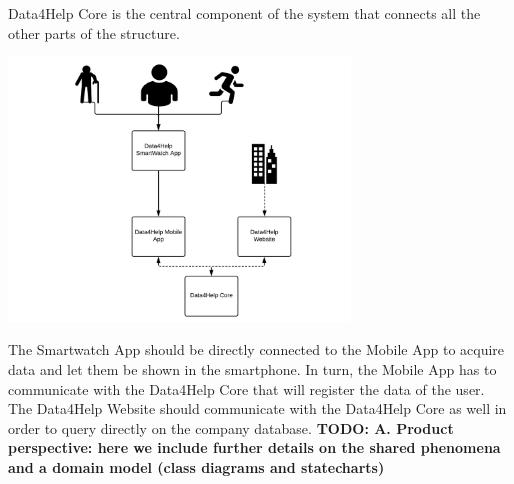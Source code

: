 Data4Help Core is the central component of the system that connects all the other parts of the structure.
\begin{center}
    \includegraphics[height=7cm]{assets/useflow.pdf}
\end{center}

The Smartwatch App should be directly connected to the Mobile App to acquire data and let them be shown in the smartphone. In turn, the Mobile App has to communicate with the Data4Help Core that will register the data of the user. The Data4Help Website should communicate with the Data4Help Core as well in order to query directly on the company database.
\newline
\textbf{
TODO: 
A. Product perspective: here we include further details on the shared phenomena and a
domain model (\textbf{class diagrams and statecharts)}
}